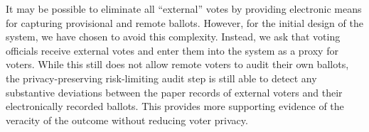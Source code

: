 It may be possible to eliminate all ``external'' votes by providing electronic means for capturing provisional and remote ballots.  However, for the initial design of the \projname system, we have chosen to avoid this complexity.  Instead, we ask that voting officials receive external votes and enter them into the \projname system as a proxy for voters.  While this still does not allow remote voters to audit their own ballots, the privacy-preserving risk-limiting audit step is still able to detect any substantive deviations between the paper records of external voters and their electronically recorded ballots.  This provides more supporting evidence of the veracity of the outcome without reducing voter privacy.



